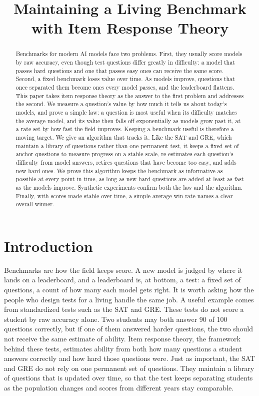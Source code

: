 \documentclass[11pt]{article}
\title{\textbf{Maintaining a Living Benchmark\\
with Item Response Theory}}
\author{}
\date{}
\theoremstyle{plain}
\theoremstyle{definition}
\theoremstyle{remark}
\begin{document}
\maketitle
\vspace{-3.2em}

\begin{abstract}
Benchmarks for modern AI models face two problems. First, they usually score models
by raw accuracy, even though test questions differ greatly in difficulty: a model
that passes hard questions and one that passes easy ones can receive the same score.
Second, a fixed benchmark loses value over time. As models improve, questions that
once separated them become ones every model passes, and the leaderboard flattens.
This paper takes item response theory as the answer to the first problem and
addresses the second. We measure a question's value by how much it tells us about
today's models, and prove a simple law: a question is most useful when its
difficulty matches the average model, and its value then falls off exponentially as
models grow past it, at a rate set by how fast the field improves. Keeping a
benchmark useful is therefore a moving target. We give an algorithm that tracks it.
Like the SAT and GRE, which maintain a library of questions rather than one permanent
test, it keeps a fixed set of anchor questions to measure progress on a stable scale,
re-estimates each question's difficulty from model answers, retires questions that
have become too easy, and adds new hard ones. We prove this algorithm keeps the
benchmark as informative as possible at every point in time, as long as new hard
questions are added at least as fast as the models improve. Synthetic experiments
confirm both the law and the algorithm. Finally, with scores made stable over time,
a simple average win-rate names a clear overall winner.
\end{abstract}

\section{Introduction}

Benchmarks are how the field keeps score. A new model is judged by where it lands
on a leaderboard, and a leaderboard is, at bottom, a test: a fixed set of questions,
a count of how many each model gets right. It is worth asking how the people who
design tests for a living handle the same job. A useful example comes from
standardized tests such as the SAT and GRE. These tests do not score a student by raw
accuracy alone. Two students may both answer 90 of 100
questions correctly, but if one of them answered harder questions, the two should not
receive the same estimate of ability. Item response theory, the framework behind
these tests, estimates ability from both how many questions a student answers
correctly and how hard those questions were. Just as important, the SAT and GRE do
not rely on one permanent set of questions. They maintain a library of questions that
is updated over time, so that the test keeps separating students as the population
changes and scores from different years stay comparable.
\end{document}
